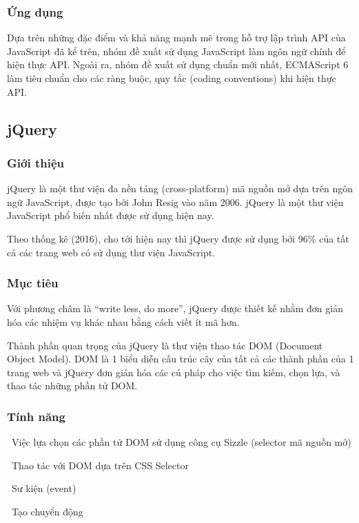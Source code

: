 \documentclass[12pt,a4paper,oneside]{article}
\begin{document}
\subsubsection{Ứng dụng}
Dựa trên những đặc điểm và khả năng mạnh mẽ trong hỗ trợ lập trình API của JavaScript đã kể trên, nhóm đề xuất sử dụng JavaScript làm ngôn ngữ chính để hiện thực API.
Ngoài ra, nhóm đề xuất sử dụng chuẩn mới nhất, ECMAScript 6 làm tiêu chuẩn cho các ràng buộc, quy tắc (coding conventions) khi hiện thực API.

\subsection{jQuery}
\subsubsection{Giới thiệu}
jQuery\cite{jqueryintro1}\cite{jqueryintro2} là một thư viện đa nền tảng (cross-platform) mã nguồn mở dựa trên ngôn ngữ JavaScript, được tạo bởi John Resig vào năm 2006. jQuery là một thư viện JavaScript phổ biến nhất được sử dụng hiện nay.

Theo thống kê (2016)\cite{jqueryusage}, cho tới hiện nay thì jQuery được sử dụng bởi 96\% của tất cả các trang web có sử dụng thư viện JavaScript.

\subsubsection{Mục tiêu}
Với phương châm là “write less, do more”, jQuery được thiết kế nhằm đơn giản hóa các nhiệm vụ khác nhau bằng cách viết ít mã hơn. 

Thành phần quan trọng của jQuery là thư viện thao tác DOM (Document Object Model). DOM là 1 biểu diễn cấu trúc cây của tất cả các thành phần của 1 trang web và jQuery đơn giản hóa các cú pháp cho việc tìm kiếm, chọn lựa, và thao tác những phần tử DOM.

\subsubsection{Tính năng}
\indent \indent \textbullet \ Việc lựa chọn các phần tử DOM sử dụng công cụ Sizzle (selector mã nguồn mở)\cite{sizzle}

\indent \textbullet \ Thao tác với DOM dựa trên CSS Selector

\indent \textbullet \ Sư kiện (event)

\indent \textbullet \ Tạo chuyển động
\end{document}
